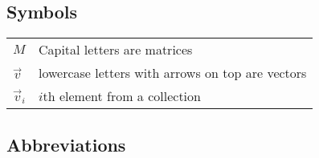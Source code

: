 
\subsection*{Symbols}

\begin{tabular}{ll}
$M$	& Capital letters are matrices\\
$\vec v$	& lowercase letters with arrows on top are vectors\\
$\vec v_i$	& $i$th element from a collection
\end{tabular}
%
%

\subsection*{Abbreviations}


